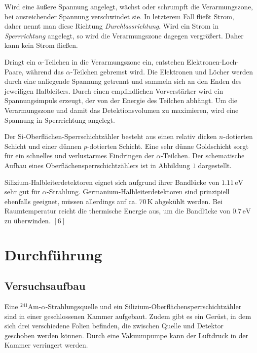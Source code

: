 \documentclass[12pt,a4paper]{scrartcl}
\numberwithin{equation}{section} %
\renewcommand{\[}{} %
\renewcommand{\]}{\noindent} %
\begin{document}
Wird eine äußere Spannung angelegt, wächst oder schrumpft die
Verarmungszone, bei ausreichender Spannung verschwindet sie. In
letzterem Fall fließt Strom, daher nennt man diese Richtung
\emph{Durchlassrichtung}. Wird ein Strom in \emph{Sperrrichtung}
angelegt, so wird die Verarmungszone dagegen vergrößert. Daher kann kein
Strom fließen.

Dringt ein \(\alpha\)-Teilchen in die Verarmungszone ein, entstehen
Elektronen-Loch-Paare, während das \(\alpha\)-Teilchen gebremst wird.
Die Elektronen und Löcher werden durch eine anliegende Spannung getrennt
und sammeln sich an den Enden des jeweiligen Halbleiters. Durch einen
empfindlichen Vorverstärker wird ein Spannungsimpuls erzeugt, der von
der Energie des Teilchen abhängt. Um die Verarmungszone und damit das
Detektionsvolumen zu maximieren, wird eine Spannung in Sperrrichtung
angelegt.

Der \(\mathrm{Si}\)-Oberflächen-Sperrschichtzähler besteht aus einen
relativ dicken \(n\)-dotierten Schicht und einer dünnen \(p\)-dotierten
Schicht. Eine sehr dünne Goldschicht sorgt für ein schnelles und
verlustarmes Eindringen der \(\alpha\)-Teilchen. Der schematische Aufbau
eines Oberflächensperrschichtzählers ist in Abbildung \(1\) dargestellt.

Silizium-Halbleiterdetektoren eignet sich aufgrund ihrer Bandlücke von
\(1.11\mathrm{\,eV}\) sehr gut für \(\alpha\)-Strahlung.
Germanium-Halbleiterdetektoren sind prinzipiell ebenfalls geeignet,
müssen allerdings auf ca. \(70\,\mathrm K\) abgekühlt werden. Bei
Raumtemperatur reicht die thermische Energie aus, um die Bandlücke von
\(0.7\mathrm{\,eV}\) zu überwinden. \([6]\)

\hypertarget{durchfuxfchrung}{%
\section{Durchführung}\label{durchfuxfchrung}}

\hypertarget{versuchsaufbau}{%
\subsection{Versuchsaufbau}\label{versuchsaufbau}}

Eine \(^{241}\mathrm{Am}\)-\(\alpha\)-Strahlungsquelle und ein
Silizium-Oberflächensperrschichtzähler sind in einer geschlossenen
Kammer aufgebaut. Zudem gibt es ein Gerüst, in dem sich drei
verschiedene Folien befinden, die zwischen Quelle und Detektor geschoben
werden können. Durch eine Vakuumpumpe kann der Luftdruck in der Kammer
verringert werden.
\end{document}
